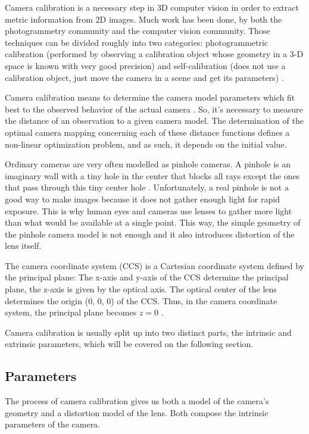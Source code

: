 \documentclass[msc, a4paper, classic, en]{ufbathesis}
\begin{document}
Camera calibration is a necessary step in 3D computer vision in order to extract metric information from 2D images. Much work has been done, by both the photogrammetry community and the computer vision community. Those techniques can be divided roughly into two categories: photogrammetric calibration (performed by observing a calibration object whose geometry in a 3-D space is known with very good precision) and self-calibration (does not use a calibration object, just move the camera in a scene and get its parameters) \cite{zhang2000flexible}.

Camera calibration means to determine the camera model parameters which fit best to the observed behavior of the actual camera \cite{hanning2011high}. So, it's necessary to measure the distance of an observation to a given camera model. The determination of the optimal camera mapping concerning each of these distance functions defines a non-linear optimization problem, and as such, it depends on the initial value.

Ordinary cameras are very often modelled as pinhole cameras. A pinhole is an imaginary wall with a tiny hole in the center that blocks all rays except the ones that pass through this tiny center hole \cite{bradski2008learning}. Unfortunately, a real pinhole is not a good way to make images because it does not gather enough light for rapid exposure. This is why human eyes and cameras use lenses to gather more light than what would be available at a single point. This way, the simple geometry of the pinhole camera model is not enough and it also introduces distortion of the lens itself.

The camera coordinate system (CCS) is a Cartesian coordinate system defined by the principal plane: The x-axis and y-axis of the CCS determine the principal plane, the z-axis is given by the optical axis. The optical center of the lens determines the origin (0, 0, 0) of the CCS. Thus, in the camera coordinate system, the principal plane becomes ${ z = 0 }$ \cite{hanning2011high}.

Camera calibration is usually split up into two distinct parts, the intrinsic and extrinsic parameters, which will be covered on the following section.

\subsection{Parameters}

The process of camera calibration gives us both a model of the camera's geometry and a distortion model of the lens. Both compose the intrinsic parameters of the camera.
\end{document}
